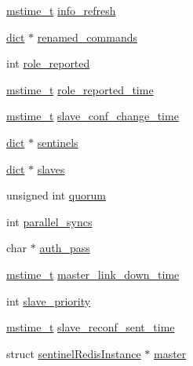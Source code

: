 \begin{DoxyCompactItemize}
\hyperlink{redismodule_8h_a652ae61e2475bc8957454534544968fc}{mstime\+\_\+t} \hyperlink{structsentinel_redis_instance_adcd45ddae15838450ca412c80b720fc3}{info\+\_\+refresh}
\item 
\hyperlink{structdict}{dict} $\ast$ \hyperlink{structsentinel_redis_instance_af072c79b87a120ba3915a71d100934dc}{renamed\+\_\+commands}
\item 
int \hyperlink{structsentinel_redis_instance_a575b8fc1b40e44a6f42dd41f8d94acdf}{role\+\_\+reported}
\item 
\hyperlink{redismodule_8h_a652ae61e2475bc8957454534544968fc}{mstime\+\_\+t} \hyperlink{structsentinel_redis_instance_a2fe16e9b00cf1b2e9142c7c33d8e6059}{role\+\_\+reported\+\_\+time}
\item 
\hyperlink{redismodule_8h_a652ae61e2475bc8957454534544968fc}{mstime\+\_\+t} \hyperlink{structsentinel_redis_instance_a14df15fc2078954784d084fabcd3fc32}{slave\+\_\+conf\+\_\+change\+\_\+time}
\item 
\hyperlink{structdict}{dict} $\ast$ \hyperlink{structsentinel_redis_instance_a314a5f324dc191af234059059ea28a1c}{sentinels}
\item 
\hyperlink{structdict}{dict} $\ast$ \hyperlink{structsentinel_redis_instance_a749938b95c27dff22b95ba61b496b61b}{slaves}
\item 
unsigned int \hyperlink{structsentinel_redis_instance_a4aace2aea8ba8274ddc3fdf6d22b76f9}{quorum}
\item 
int \hyperlink{structsentinel_redis_instance_a8fc2600c9eee13cfae1762008e5f6056}{parallel\+\_\+syncs}
\item 
char $\ast$ \hyperlink{structsentinel_redis_instance_a762948fae76808fbca62b4d0b00b61b7}{auth\+\_\+pass}
\item 
\hyperlink{redismodule_8h_a652ae61e2475bc8957454534544968fc}{mstime\+\_\+t} \hyperlink{structsentinel_redis_instance_aff499a07b1a5c6f9ad944667d9db1717}{master\+\_\+link\+\_\+down\+\_\+time}
\item 
int \hyperlink{structsentinel_redis_instance_aaf81cefb84c292ee7dee2cbf749595fb}{slave\+\_\+priority}
\item 
\hyperlink{redismodule_8h_a652ae61e2475bc8957454534544968fc}{mstime\+\_\+t} \hyperlink{structsentinel_redis_instance_ac8f34568436b420eab8af5c594e287da}{slave\+\_\+reconf\+\_\+sent\+\_\+time}
\item 
struct \hyperlink{structsentinel_redis_instance}{sentinel\+Redis\+Instance} $\ast$ \hyperlink{structsentinel_redis_instance_aa3598d9f9ce1dc3e9aa631970a76d7ec}{master}
\item 

\end{DoxyCompactItemize}
